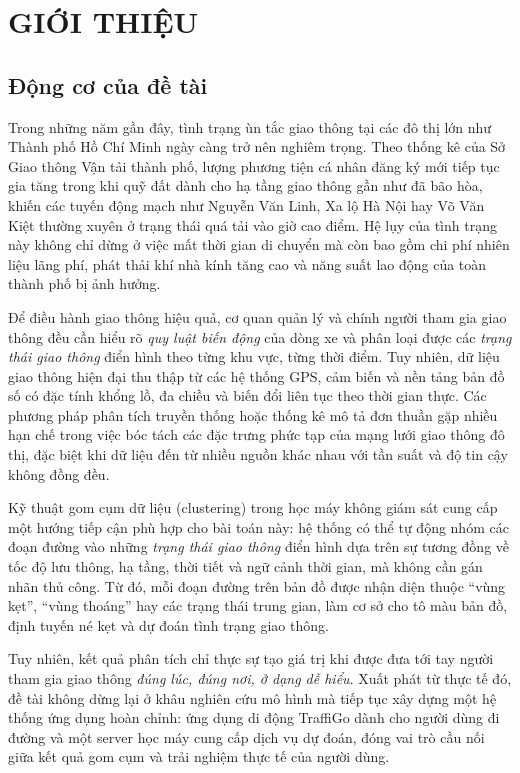 
\chapter{GIỚI THIỆU}

\section{Động cơ của đề tài}
Trong những năm gần đây, tình trạng ùn tắc giao thông tại các đô thị lớn như Thành phố Hồ Chí Minh ngày càng trở nên nghiêm trọng. Theo thống kê của Sở Giao thông Vận tải thành phố, lượng phương tiện cá nhân đăng ký mới tiếp tục gia tăng trong khi quỹ đất dành cho hạ tầng giao thông gần như đã bão hòa, khiến các tuyến động mạch như Nguyễn Văn Linh, Xa lộ Hà Nội hay Võ Văn Kiệt thường xuyên ở trạng thái quá tải vào giờ cao điểm. Hệ lụy của tình trạng này không chỉ dừng ở việc mất thời gian di chuyển mà còn bao gồm chi phí nhiên liệu lãng phí, phát thải khí nhà kính tăng cao và năng suất lao động của toàn thành phố bị ảnh hưởng.

Để điều hành giao thông hiệu quả, cơ quan quản lý và chính người tham gia giao thông đều cần hiểu rõ \textit{quy luật biến động} của dòng xe và phân loại được các \textit{trạng thái giao thông} điển hình theo từng khu vực, từng thời điểm. Tuy nhiên, dữ liệu giao thông hiện đại thu thập từ các hệ thống GPS, cảm biến và nền tảng bản đồ số có đặc tính khổng lồ, đa chiều và biến đổi liên tục theo thời gian thực. Các phương pháp phân tích truyền thống hoặc thống kê mô tả đơn thuần gặp nhiều hạn chế trong việc bóc tách các đặc trưng phức tạp của mạng lưới giao thông đô thị, đặc biệt khi dữ liệu đến từ nhiều nguồn khác nhau với tần suất và độ tin cậy không đồng đều.

Kỹ thuật gom cụm dữ liệu (clustering) trong học máy không giám sát cung cấp một hướng tiếp cận phù hợp cho bài toán này: hệ thống có thể tự động nhóm các đoạn đường vào những \textit{trạng thái giao thông} điển hình dựa trên sự tương đồng về tốc độ lưu thông, hạ tầng, thời tiết và ngữ cảnh thời gian, mà không cần gán nhãn thủ công. Từ đó, mỗi đoạn đường trên bản đồ được nhận diện thuộc ``vùng kẹt'', ``vùng thoáng'' hay các trạng thái trung gian, làm cơ sở cho tô màu bản đồ, định tuyến né kẹt và dự đoán tình trạng giao thông.

Tuy nhiên, kết quả phân tích chỉ thực sự tạo giá trị khi được đưa tới tay người tham gia giao thông \textit{đúng lúc, đúng nơi, ở dạng dễ hiểu}. Xuất phát từ thực tế đó, đề tài không dừng lại ở khâu nghiên cứu mô hình mà tiếp tục xây dựng một hệ thống ứng dụng hoàn chỉnh: ứng dụng di động TraffiGo dành cho người dùng đi đường và một server học máy cung cấp dịch vụ dự đoán, đóng vai trò cầu nối giữa kết quả gom cụm và trải nghiệm thực tế của người dùng.

